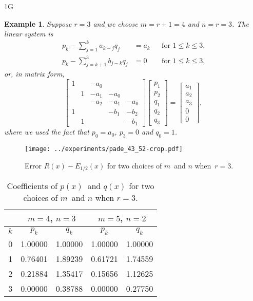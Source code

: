 \documentclass[12pt,a4paper]{article}
\newtheorem{example}{Example}
\begin{document}
1G\begin{example}
Suppose $r=3$ and we choose $m=r+1=4$ and $n=r=3$.  The linear system is
\[
\begin{aligned}
p_k-\sum_{j=1}^ka_{k-j}q_j&=a_k&&\text{for $1\le k\le 3$,}\\
p_k-\sum_{j=k+1}^3b_{j-k}q_j&=0&&\text{for $1\le k\le 3$,}
\end{aligned}
\]
or, in matrix form,
\[
\begin{bmatrix}
1& &-a_0&    &    \\
 &1&-a_1&-a_0&    \\
 & &-a_2&-a_1&-a_0\\
1& &    &-b_1&-b_2\\
 &1&    &    &-b_1
\end{bmatrix}
\begin{bmatrix}p_1\\ p_2\\ q_1\\ q_2\\ q_3\end{bmatrix}
=\begin{bmatrix}a_1\\ a_2\\ a_3\\ 0\\ 0\end{bmatrix},
\]
where we used the fact that $p_0=a_0$, $p_3=0$ and $q_0=1$.
\end{example}

\begin{figure}
\caption{Error $R(x)-E_{1/2}(x)$ for two choices of $m$~and $n$ when~$r=3$.}
\label{fig: pade 43 52 error}
\begin{center}
\texttt{[image: ../experiments/pade\_43\_52-crop.pdf]}
\end{center}
\end{figure}

\begin{table}
\caption{Coefficients of $p(x)$~and $q(x)$ for two choices of $m$~and $n$
when $r=3$.}\label{tab: pade 43 52 coef}
\begin{center}
\renewcommand{\arraystretch}{1.2}
\begin{tabular}{c|cc|cc}
   &\multicolumn{2}{c|}{$m=4$, $n=3$}
   &\multicolumn{2}{c}{$m=5$, $n=2$}\\
\hline
$k$&$p_k$&$q_k$&$p_k$&$q_k$\\
\hline
   0&  1.00000&  1.00000&  1.00000&  1.00000\\
   1&  0.76401&  1.89239&  0.61721&  1.74559\\
   2&  0.21884&  1.35417&  0.15656&  1.12625\\
   3&  0.00000&  0.38788&  0.00000&  0.27750
\end{tabular}
\end{center}
\end{table}
\end{document}
